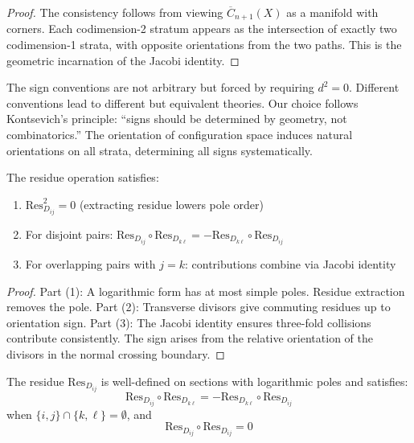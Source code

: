    \begin{proof}
   The consistency follows from viewing $\overline{C}_{n+1}(X)$ as a manifold with corners. Each codimension-2 
   stratum appears as the intersection of exactly two codimension-1 strata, with opposite orientations 
   from the two paths. This is the geometric incarnation of the Jacobi identity.
   \end{proof}
   
   \begin{remark}
   The sign conventions are not arbitrary but forced by requiring $d^2 = 0$. Different conventions lead to 
   different but equivalent theories. Our choice follows Kontsevich's principle: ``signs should be determined 
   by geometry, not combinatorics.'' The orientation of configuration space induces natural orientations on 
   all strata, determining all signs systematically.
   \end{remark}
   
   \begin{lemma}
   The residue operation satisfies:
   \begin{enumerate}
   \item $\text{Res}_{D_{ij}}^2 = 0$ (extracting residue lowers pole order)
   \item For disjoint pairs: $\text{Res}_{D_{ij}} \circ \text{Res}_{D_{k\ell}} = -\text{Res}_{D_{k\ell}} \circ \text{Res}_{D_{ij}}$
   \item For overlapping pairs with $j = k$: contributions combine via Jacobi identity
   \end{enumerate}
   \end{lemma}
   
   \begin{proof}
   Part (1): A logarithmic form has at most simple poles. Residue extraction removes the pole.
   Part (2): Transverse divisors give commuting residues up to orientation sign.
   Part (3): The Jacobi identity ensures three-fold collisions contribute consistently.
   The sign arises from the relative orientation of the divisors in the normal crossing boundary.
   \end{proof}
 
\begin{lemma}
The residue $\text{Res}_{D_{ij}}$ is well-defined on sections with logarithmic poles and satisfies:
\[
\text{Res}_{D_{ij}} \circ \text{Res}_{D_{k\ell}} = -\text{Res}_{D_{k\ell}} \circ \text{Res}_{D_{ij}}
\]
when $\{i,j\} \cap \{k,\ell\} = \emptyset$, and
\[
\text{Res}_{D_{ij}} \circ \text{Res}_{D_{ij}} = 0
\]
\end{lemma}
 
